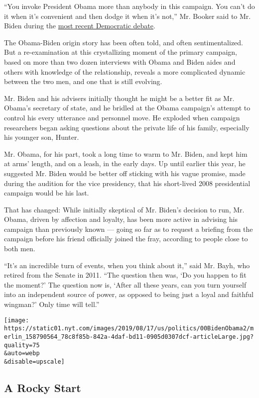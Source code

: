 ``You invoke President Obama more than anybody in this campaign. You
can't do it when it's convenient and then dodge it when it's not,'' Mr.
Booker said to Mr. Biden during the
\href{https://www.nytimes.com/2019/07/31/us/politics/live-updates-democratic-debate.html?module=inline}{most
recent Democratic debate}.

The Obama-Biden origin story has been often told, and often
sentimentalized. But a re-examination at this crystallizing moment of
the primary campaign, based on more than two dozen interviews with Obama
and Biden aides and others with knowledge of the relationship, reveals a
more complicated dynamic between the two men, and one that is still
evolving.

Mr. Biden and his advisers initially thought he might be a better fit as
Mr. Obama's secretary of state, and he bridled at the Obama campaign's
attempt to control his every utterance and personnel move. He exploded
when campaign researchers began asking questions about the private life
of his family, especially his younger son, Hunter.

Mr. Obama, for his part, took a long time to warm to Mr. Biden, and kept
him at arms' length, and on a leash, in the early days. Up until earlier
this year, he suggested Mr. Biden would be better off sticking with his
vague promise, made during the audition for the vice presidency, that
his short-lived 2008 presidential campaign would be his last.

That has changed: While initially skeptical of Mr. Biden's decision to
run, Mr. Obama, driven by affection and loyalty, has been more active in
advising his campaign than previously known --- going so far as to
request a briefing from the campaign before his friend officially joined
the fray, according to people close to both men.

``It's an incredible turn of events, when you think about it,'' said Mr.
Bayh, who retired from the Senate in 2011. ``The question then was, `Do
you happen to fit the moment?' The question now is, `After all these
years, can you turn yourself into an independent source of power, as
opposed to being just a loyal and faithful wingman?' Only time will
tell.''

\texttt{[image: https://static01.nyt.com/images/2019/08/17/us/politics/00BidenObama2/merlin\_158790564\_78c8f85b-842a-4daf-bd11-0905d0307dcf-articleLarge.jpg?quality=75\\\&auto=webp\\\&disable=upscale]}

\hypertarget{a-rocky-start}{%
\subsection{A Rocky Start}\label{a-rocky-start}}

